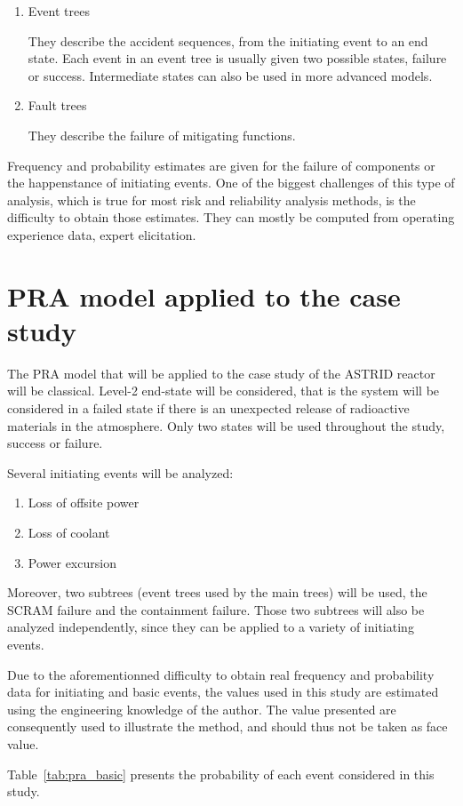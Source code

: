 \begin{enumerate}
\item Event trees

They describe the accident sequences, from the initiating event to an end state. Each event in an event tree is usually given two possible states, failure or success. Intermediate states can also be used in more advanced models.

\item Fault trees

They describe the failure of mitigating functions.
\end{enumerate}

Frequency and probability estimates are given for the failure of components or the happenstance of initiating events. One of the biggest challenges of this type of analysis, which is true for most risk and reliability analysis methods, is the difficulty to obtain those estimates. They can mostly be computed from operating experience data, expert elicitation.

\section{PRA model applied to the case study}

The PRA model that will be applied to the case study of the ASTRID reactor will be classical. Level-2 end-state will be considered, that is the system will be considered in a failed state if there is an unexpected release of radioactive materials in the atmosphere. Only two states will be used throughout the study, success or failure.

Several initiating events will be analyzed:

\begin{enumerate}
\item Loss of offsite power
\item Loss of coolant
\item Power excursion
\end{enumerate}

Moreover, two subtrees (event trees used by the main trees) will be used, the SCRAM failure and the containment failure. Those two subtrees will also be analyzed independently, since they can be applied to a variety of initiating events.

Due to the aforementionned difficulty to obtain real frequency and probability data for initiating and basic events, the values used in this study are estimated using the engineering knowledge of the author. The value presented are consequently used to illustrate the method, and should thus not be taken as face value.

Table~\ref{tab:pra_basic} presents the probability of each event considered in this study.
